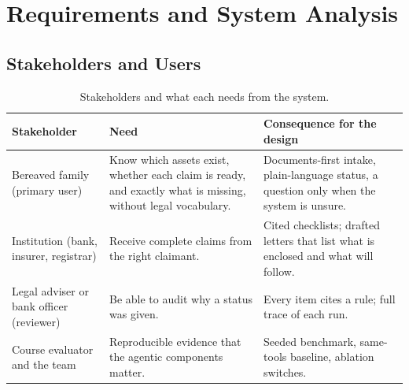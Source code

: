 \chapter{Requirements and System Analysis}
\section{Stakeholders and Users}
\begin{table}[H]
\centering\small{}
\caption{Stakeholders and what each needs from the system.}\label{tab:stake}
\renewcommand{\arraystretch}{1.15}
\begin{tabularx}{\linewidth}{@{}p{3.2cm}X X@{}}
\toprule
\textbf{Stakeholder} & \textbf{Need} & \textbf{Consequence for the design} \\ \midrule
Bereaved family (primary user) & Know which assets exist, whether each claim is ready, and exactly what is missing, without legal vocabulary. & Documents-first intake, plain-language status, a question only when the system is unsure. \\
Institution (bank, insurer, registrar) & Receive complete claims from the right claimant. & Cited checklists; drafted letters that list what is enclosed and what will follow. \\
Legal adviser or bank officer (reviewer) & Be able to audit why a status was given. & Every item cites a rule; full trace of each run. \\
Course evaluator and the team & Reproducible evidence that the agentic components matter. & Seeded benchmark, same-tools baseline, ablation switches. \\ \bottomrule
\end{tabularx}
\end{table}

